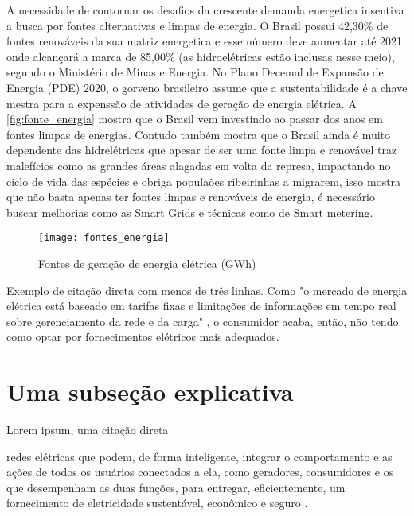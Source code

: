 A necessidade de contornar os desafios da crescente demanda energetica insentiva a busca por fontes alternativas e limpas de energia. O Brasil 
possui 42,30\% de fontes renováveis da sua matriz energetica e esse número deve aumentar até 2021 onde alcançará a marca de 85,00\% (as hidroelétricas
estão inclusas nesse meio), segundo o Ministério de Minas e Energia. No Plano Decemal de Expansão de Energia (PDE) 2020, o gorveno brasileiro
assume que a sustentabilidade é a chave mestra para a expenssão de atividades de geração de energia elétrica. A \autoref{fig:fonte_energia} mostra
que o Brasil vem investindo ao passar dos anos em fontes limpas de energias. Contudo também mostra que o Brasil ainda é muito dependente das 
hidrelétricas que apesar de ser uma fonte limpa e renovável traz malefícios como as grandes áreas alagadas em volta da represa, impactando no
ciclo de vida das espécies e obriga populaões ribeirinhas a migrarem, isso mostra que não basta apenas ter fontes limpas
e renováveis de energia, é necessário buscar melhorias como as Smart Grids e técnicas como de Smart metering.




\begin{figure}[h!]
	\texttt{[image: fontes\_energia]}
	\centering
	\caption[Fontes de geração de energia elétrica (GWh)]{Fontes de geração de energia elétrica (GWh)}
	\label{fig:fonte_energia}
\end{figure}
\FloatBarrier

Exemplo de citação direta com menos de três linhas. Como "o mercado de energia elétrica está baseado em tarifas fixas e limitações de informações em tempo real sobre gerenciamento da rede e da carga" \cite[p. 15]{cgee}, o consumidor acaba, então, não tendo como optar por fornecimentos elétricos mais adequados. 


\section{Uma subseção explicativa}

Lorem ipsum, uma citação direta 

\begin{citacao}[brazil]
[...] redes elétricas que podem, de forma inteligente, integrar o comportamento e as ações de todos os usuários conectados a ela, como geradores, consumidores e os que desempenham as duas funções, para entregar, eficientemente, um fornecimento de eletricidade sustentável, econômico e seguro \cite[p. 51, tradução livre]{yu2011new}.
\end{citacao}

